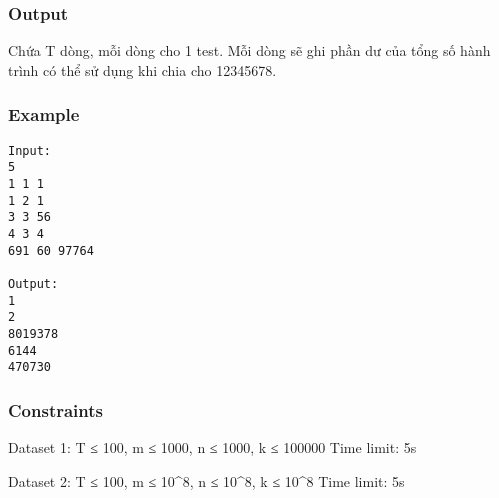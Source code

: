 \subsubsection{   Output  }

   Chứa T dòng, mỗi dòng cho 1 test. Mỗi dòng sẽ ghi phần dư của tổng số hành trình có thể sử dụng khi chia cho 12345678.  

\subsubsection{   Example  }
\begin{verbatim}
Input:
5
1 1 1
1 2 1
3 3 56
4 3 4
691 60 97764

Output:
1
2
8019378
6144
470730 
\end{verbatim}

\subsubsection{   Constraints  }

   Dataset 1: T ≤ 100, m ≤ 1000, n ≤ 1000, k ≤ 100000 Time limit: 5s  

   Dataset 2: T ≤ 100, m ≤ 10\textasciicircum8, n ≤ 10\textasciicircum8, k ≤ 10\textasciicircum8 Time limit: 5s  